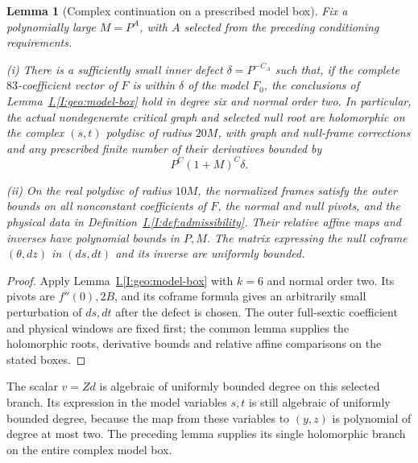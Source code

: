 \documentclass[11pt]{amsart}
\newtheorem{lemma}[theorem]{Lemma}
\theoremstyle{definition}
\theoremstyle{remark}
\numberwithin{equation}{section}
\newcommand{\partIref}[1]{\hyperref[I:#1]{I.\ref*{I:#1}}}
\begin{document}
\begin{lemma}[Complex continuation on a prescribed model box]\label{low:6:r1:complex-box}
Fix a polynomially large $M=P^A$, with $A$ selected from the preceding conditioning requirements.

\noindent\textup{(i)} There is a sufficiently small inner defect $\delta=P^{-C_A}$ such that, if the complete $83$-coefficient vector of $F$ is within $\delta$ of the model $F_0$, the conclusions of Lemma~\partIref{geo:model-box} hold in degree six and normal order two. In particular, the actual nondegenerate critical graph and selected null root are holomorphic on the complex $(s,t)$ polydisc of radius $20M$, with graph and null-frame corrections and any prescribed finite number of their derivatives bounded by
\[
P^C(1+M)^C\delta.
\]

\noindent\textup{(ii)} On the real polydisc of radius $10M$, the normalized frames satisfy the outer bounds on all nonconstant coefficients of $F$, the normal and null pivots, and the physical data in Definition~\partIref{def:admissibility}. Their relative affine maps and inverses have polynomial bounds in $P,M$. The matrix expressing the null coframe $(\theta,dz)$ in $(ds,dt)$ and its inverse are uniformly bounded.
\end{lemma}
\begin{proof}
Apply Lemma~\partIref{geo:model-box} with $k=6$ and normal order two. Its pivots are $f''(0),2B$, and its coframe formula gives an arbitrarily small perturbation of $ds,dt$ after the defect is chosen. The outer full-sextic coefficient and physical windows are fixed first; the common lemma supplies the holomorphic roots, derivative bounds and relative affine comparisons on the stated boxes.
\end{proof}

The scalar $v=Zd$ is algebraic of uniformly bounded degree on this selected branch. Its expression in the model variables $s,t$ is still algebraic of uniformly bounded degree, because the map from these variables to $(y,z)$ is polynomial of degree at most two. The preceding lemma supplies its single holomorphic branch on the entire complex model box. 
\end{document}
